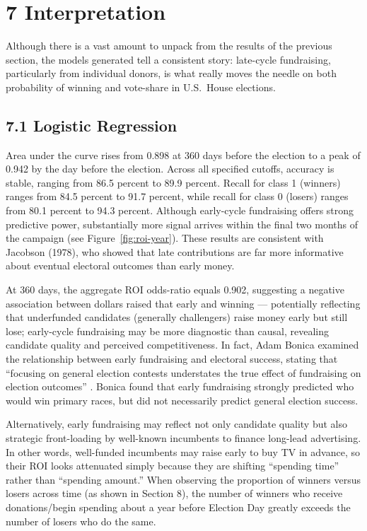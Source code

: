 \section*{7 Interpretation}

Although there is a vast amount to unpack from the results of the previous section, the models generated tell a consistent story: late-cycle fundraising, particularly from individual donors, is what really moves the needle on both probability of winning and vote-share in U.S.\ House elections. 

\subsection*{7.1 Logistic Regression}

Area under the curve rises from 0.898 at 360 days before the election to a peak of 0.942 by the day before the election. Across all specified cutoffs, accuracy is stable, ranging from 86.5 percent to 89.9 percent. Recall for class 1 (winners) ranges from 84.5 percent to 91.7 percent, while recall for class 0 (losers) ranges from 80.1 percent to 94.3 percent. Although early-cycle fundraising offers strong predictive power, substantially more signal arrives within the final two months of the campaign (see Figure~\ref{fig:roi-year}). These results are consistent with Jacobson (1978), who showed that late contributions are far more informative about eventual electoral outcomes than early money.

\indent At 360 days, the aggregate ROI odds-ratio equals 0.902, suggesting a negative association between dollars raised that early and winning --- potentially reflecting that underfunded candidates (generally challengers) raise money early but still lose; early-cycle fundraising may be more diagnostic than causal, revealing candidate quality and perceived competitiveness. In fact, Adam Bonica examined the relationship between early fundraising and electoral success, stating that ``focusing on general election contests understates the true effect of fundraising on election outcomes'' \cite{bonica2016}. Bonica found that early fundraising strongly predicted who would win primary races, but did not necessarily predict general election success.

\indent Alternatively, early fundraising may reflect not only candidate quality but also strategic front-loading by well-known incumbents to finance long-lead advertising. In other words, well-funded incumbents may raise early to buy TV in advance, so their ROI looks attenuated simply because they are shifting ``spending time'' rather than ``spending amount.'' When observing the proportion of winners versus losers across time (as shown in Section 8), the number of winners who receive donations/begin spending about a year before Election Day greatly exceeds the number of losers who do the same.

